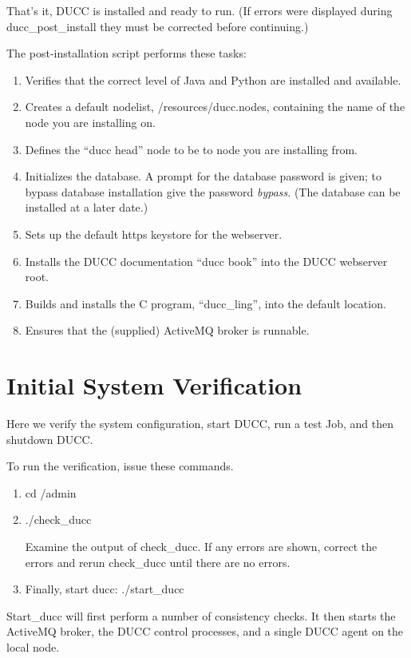 That's it, DUCC is installed and ready to run. (If errors were displayed during ducc\_post\_install
they must be corrected before continuing.)

The post-installation script performs these tasks:
\begin{enumerate}
    \item Verifies that the correct level of Java and Python are installed and available.
    \item Creates a default nodelist, \duccruntime/resources/ducc.nodes, containing the name of the node you are installing on.
    \item Defines the ``ducc head'' node to be to node you are installing from.
    \item Initializes the database. A prompt for the database password is given; to bypass
      database installation give the password {\em bypass}. (The database can be installed
      at a later date.)
    \item Sets up the default https keystore for the webserver.
    \item Installs the DUCC documentation ``ducc book'' into the DUCC webserver root.
    \item Builds and installs the C program, ``ducc\_ling'', into the default location.
    \item Ensures that the (supplied) ActiveMQ broker is runnable.
\end{enumerate}

\section{Initial System Verification}

Here we verify the system configuration, start DUCC, run a test Job, and then shutdown DUCC.

To run the verification, issue these commands.
\begin{enumerate}
  \item cd \duccruntime/admin 
  \item ./check\_ducc
  
    Examine the output of check\_ducc.  If any errors are shown, correct the errors and rerun
    check\_ducc until there are no errors.  
  \item Finally, start ducc: ./start\_ducc
  \end{enumerate}
  
  Start\_ducc will first perform a number of consistency checks.
  It then starts the ActiveMQ broker, the DUCC control processes, and a single DUCC agent on the
  local node.

